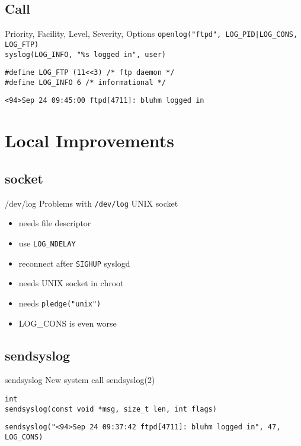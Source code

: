 \documentclass[14pt]{beamer}
\begin{document}
\subsection{Call}

\begin{frame}{Priority, Facility, Level, Severity, Options}
    \texttt{openlog("ftpd", LOG\_PID|LOG\_CONS, LOG\_FTP)}\\
    \texttt{syslog(LOG\_INFO, "\%s logged in", user)}

    \vspace{.5cm}
    \texttt{\#define LOG\_FTP  (11<<3) /* ftp daemon */}\\
    \texttt{\#define LOG\_INFO 6       /* informational */ }

    \vspace{.5cm}
    \texttt{<94>Sep 24 09:45:00 ftpd[4711]:\ bluhm logged in}
\end{frame}

\section{Local Improvements}

\subsection{socket}

\begin{frame}{/dev/log}
Problems with \texttt{/dev/log} UNIX socket
\begin{itemize}
    \item needs file descriptor
    \item use \texttt{LOG\_NDELAY}
    \item reconnect after \texttt{SIGHUP} syslogd
    \item needs UNIX socket in chroot
    \item needs \texttt{pledge("unix")}
    \item LOG\_CONS is even worse
\end{itemize}
\end{frame}

\subsection{sendsyslog}

\begin{frame}{sendsyslog}
    New system call sendsyslog(2)

    \vspace{.5cm}
    \texttt{int \\
    sendsyslog(const void *msg, size\_t len, int flags)}

    \vspace{.5cm}
    \texttt{sendsyslog("<94>Sep 24 09:37:42 ftpd[4711]:\ 
	bluhm logged in", 47, LOG\_CONS)}
\end{frame}
\end{document}
